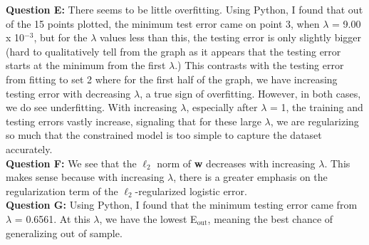 \documentclass[12 pt]{article}
\begin{document}
	\noindent\textbf{Question E:} There seems to be little overfitting.  Using Python, I found that out of the 15 points plotted, the minimum test error came on point 3, when $\lambda$ = 9.00 x 10$^{-3}$, but for the $\lambda$ values less than this, the testing error is only slightly bigger (hard to qualitatively tell from the graph as it appears that the testing error starts at the minimum from the first $\lambda$.) This contrasts with the testing error from fitting to set 2 where for the first half of the graph, we have increasing testing error with decreasing $\lambda$, a true sign of overfitting. However, in both cases, we do see underfitting. With increasing $\lambda$, especially after $\lambda$ = 1, the training and testing errors vastly increase, signaling that for these large $\lambda$, we are regularizing so much that the constrained model is too simple to capture the dataset accurately. \\
	
	\noindent\textbf{Question F:} We see that the $\ell_2$ norm of \textbf{w} decreases with increasing $\lambda$. This makes sense because with increasing $\lambda$, there is a greater emphasis on the regularization term of the $\ell_2$-regularized logistic error. \\
	
	\noindent\textbf{Question G:} Using Python, I found that the minimum testing error came from $\lambda$ = 0.6561. At this $\lambda$, we have the lowest E$_\text{out}$, meaning the best chance of generalizing out of sample.\\
	
\end{document}
